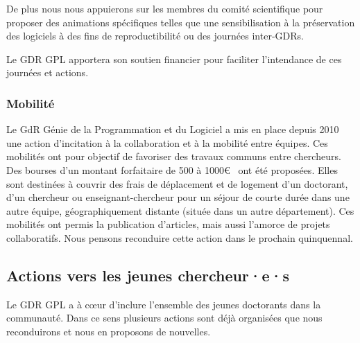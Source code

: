 \documentclass[11pt]{article}
\begin{document}
De plus nous nous appuierons sur les membres du comité scientifique pour proposer des animations spécifiques telles que une sensibilisation à la préservation des logiciels à des fins de reproductibilité ou des journées inter-GDRs. 

Le GDR GPL apportera son soutien financier pour faciliter l'intendance de ces journées et actions.



\subsubsection{Mobilité}
Le GdR Génie de la Programmation et du Logiciel a mis en place depuis 2010 une action d'incitation à la collaboration et à la mobilité entre équipes. Ces mobilités ont pour objectif de favoriser des travaux communs
entre chercheurs. Des bourses d'un montant forfaitaire de 500 à 1000\euro~ ont été proposées. Elles sont destinées à couvrir des frais de déplacement et de logement d'un doctorant, d'un chercheur ou enseignant-chercheur pour un séjour de courte durée dans une autre équipe, géographiquement distante (située dans un autre département). Ces mobilités ont permis la publication d'articles, mais aussi l'amorce de projets collaboratifs. Nous pensons reconduire cette action dans le prochain quinquennal.

\subsection{Actions vers les jeunes chercheur·e·s}

Le GDR GPL a à c{\oe}ur d'inclure l'ensemble des jeunes doctorants dans la
communauté. Dans ce sens plusieurs actions sont déjà organisées que nous reconduirons et nous en proposons de nouvelles.
\end{document}
